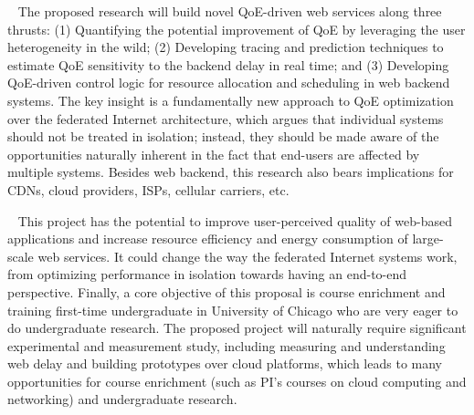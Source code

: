 \documentclass{proposalnsf}
\newcommand{\mypara}[1]{\smallskip\noindent{\bf {#1}:}~}
\begin{document}
\mypara{Intellectual merit}
The proposed research will build novel QoE-driven web services along three thrusts:
(1) Quantifying the potential improvement of QoE by leveraging the user heterogeneity in the wild;
(2) Developing tracing and prediction techniques to estimate QoE sensitivity to the backend delay in real time; and
(3) Developing QoE-driven control logic for resource allocation and scheduling in web backend systems.
The key insight is a fundamentally new approach to QoE optimization over the federated Internet architecture, which argues that individual systems should not be treated in isolation; instead, they should be made aware of the opportunities naturally inherent in the fact that end-users are affected by multiple systems.
Besides web backend, this research also bears implications for CDNs, cloud providers, ISPs, cellular carriers, etc.

\mypara{Broader impacts}
This project has the potential to improve user-perceived quality of web-based applications and increase resource efficiency and energy consumption of large-scale web services.
It could change the way the federated Internet systems work, from optimizing performance in isolation towards having an end-to-end perspective.
Finally, a core objective of this proposal is course enrichment and training first-time undergraduate in University of Chicago who are very eager to do undergraduate research.
The proposed project will naturally require significant experimental and measurement study, including measuring and understanding web delay and building prototypes over cloud platforms, which leads to many opportunities for course enrichment (such as PI's courses on cloud computing and networking) and undergraduate research.
\end{document}
